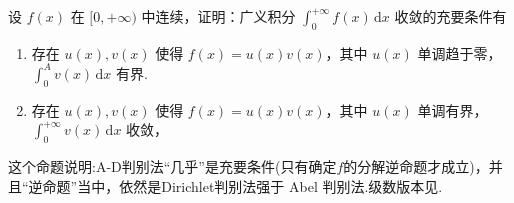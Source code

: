 \documentclass[../../main.tex]{subfiles}%
\begin{document}
\begin{proposition}\label{proposition:A-D判别法是积分收敛的“充要条件”}
设 $f(x)$ 在 $[0,+\infty)$ 中连续，证明：广义积分 $\int_{0}^{+\infty}f(x)\,\mathrm{d}x$ 收敛的充要条件有
\begin{enumerate}
\item 存在 $u(x),v(x)$ 使得 $f(x)=u(x)v(x)$，其中 $u(x)$ 单调趋于零，$\int_{0}^{A}v(x)\,\mathrm{d}x$ 有界.

\item 存在 $u(x),v(x)$ 使得 $f(x)=u(x)v(x)$，其中 $u(x)$ 单调有界，$\int_{0}^{+\infty}v(x)\,\mathrm{d}x$ 收敛，
\end{enumerate}
\end{proposition}
\begin{note}
这个命题说明:A-D判别法“几乎”是充要条件(只有确定$f$的分解逆命题才成立)，并且“逆命题”当中，依然是Dirichlet判别法强于 Abel 判别法.级数版本见.
\end{note}
\end{document}
